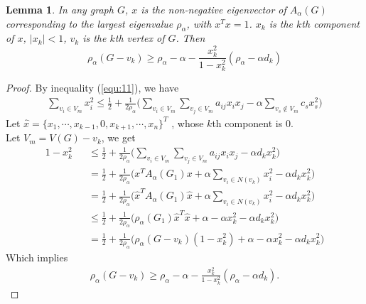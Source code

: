 \documentclass[amsthm]{elsart}
\newtheorem{lemma}{Lemma}[section]
\begin{document}
\begin{lemma} \label{lem:2}
In any graph $G$, $x$ is the non-negative eigenvector of $A_\alpha (G)$ corresponding to the largest eigenvalue $\rho _\alpha$, with $x^T x = 1$. $x_k$ is the $k$th component of $x$, $\mid x_k \mid < 1$, $v_k$ is  the $k$th vertex of $G$. Then 
\begin{equation} \label{equ:13}
\rho _\alpha (G - v_k)
    \geqslant \rho _\alpha - \alpha - \frac{x_k^2}{1 - x_k^2} (\rho _\alpha - \alpha d_k)
\end{equation}
\end{lemma}

\begin{proof} 
By inequality (\ref{equ:11}), we have 
\begin{eqnarray*}
\sum \limits_{v_i \in V_m}^{} x_i^2
\leqslant \frac{1}{2} + \frac{1}{2 \rho_\alpha} \Big( \sum \limits_{v_i \in V_m}^{} \sum \limits_{v_j \in V_m}^{} a_{ij} x_i x_j - \alpha \sum \limits_{v_s \notin V_m}^{} c_s x_s^2 \Big)
\end{eqnarray*}
Let $\hat{x} = \{x_1, \cdots, x_{k-1}, 0, x_{k+1}, \cdots, x_n\}^T$ , whose $k$th component is 0. \\
Let $V_m = V(G) - v_k$,  we get 
\begin{eqnarray*}
1 - x_k^2
&&\leqslant \frac{1}{2} + \frac{1}{2 \rho_\alpha} \Big( \sum \limits_{v_i \in V_m}^{} \sum \limits_{v_j \in V_m}^{} a_{ij} x_i x_j - \alpha d_k x_k^2 \Big)
\\ &&= \frac{1}{2} + \frac{1}{2 \rho_\alpha} \Big( x^T A_\alpha(G_1) x + \alpha \sum \limits_{v_i \in N(v_k)}^{} x_i^2 - \alpha d_k x_k^2 \Big) 
\\ &&= \frac{1}{2} + \frac{1}{2 \rho_\alpha} \Big( \hat{x}^T A_\alpha(G_1) \hat{x} + \alpha \sum \limits_{v_i \in N(v_k)}^{} x_i^2 - \alpha d_k x_k^2 \Big) 
\\ &&\leqslant \frac{1}{2} + \frac{1}{2 \rho_\alpha} \Big( \rho_\alpha (G_1) \hat{x}^T \hat{x} + \alpha - \alpha  x_k^2 - \alpha d_k x_k^2 \Big)
\\ &&= \frac{1}{2} + \frac{1}{2 \rho_\alpha} \Big( \rho_\alpha (G - v_k) (1 - x_k^2) + \alpha - \alpha  x_k^2 - \alpha d_k x_k^2 \Big)
\end{eqnarray*}
Which implies
\begin{eqnarray*}
  \rho_\alpha (G - v_k) \geqslant \rho_\alpha - \alpha - \frac{x_k^2}{1 - x_k^2} ( \rho_\alpha - \alpha d_k).
\end{eqnarray*}
\end{proof} 
\end{document}
